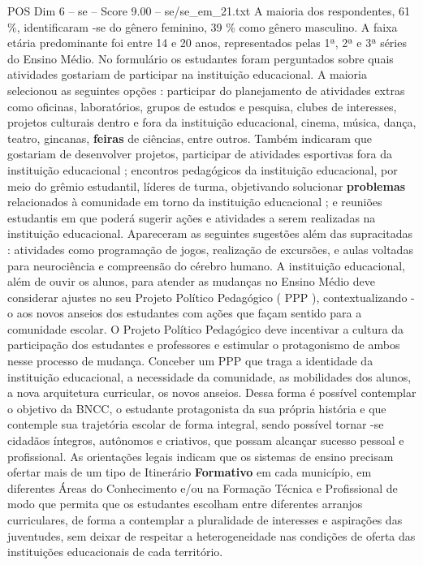 \begin{textsample}{POS Dim 6 – se – Score 9.00 – se/se\_em\_21.txt}
A maioria dos respondentes, 61 \%, identificaram -se do gênero feminino, 39 \% como gênero masculino.
A faixa etária predominante foi entre 14 e 20 anos, representados pelas 1ª, 2ª e 3ª séries do Ensino Médio.
No formulário os estudantes foram perguntados sobre quais atividades gostariam de participar na instituição educacional.
A maioria selecionou as seguintes opções : participar do planejamento de atividades extras como oficinas, laboratórios, grupos de estudos e pesquisa, clubes de interesses, projetos culturais dentro e fora da instituição educacional, cinema, música, dança, teatro, gincanas, \textbf{feiras} de ciências, entre outros.
Também indicaram que gostariam de desenvolver projetos, participar de atividades esportivas fora da instituição educacional ; encontros pedagógicos da instituição educacional, por meio do grêmio estudantil, líderes de turma, objetivando solucionar \textbf{problemas} relacionados à comunidade em torno da instituição educacional ; e reuniões estudantis em que poderá sugerir ações e atividades a serem realizadas na instituição educacional.
Apareceram as seguintes sugestões além das supracitadas : atividades como programação de jogos, realização de excursões, e aulas voltadas para neurociência e compreensão do cérebro humano.
A instituição educacional, além de ouvir os alunos, para atender as mudanças no Ensino Médio deve considerar ajustes no seu Projeto Político Pedagógico ( PPP ), contextualizando -o aos novos anseios dos estudantes com ações que façam sentido para a comunidade escolar.
O Projeto Político Pedagógico deve incentivar a cultura da participação dos estudantes e professores e estimular o protagonismo de ambos nesse processo de mudança.
Conceber um PPP que traga a identidade da instituição educacional, a necessidade da comunidade, as mobilidades dos alunos, a nova arquitetura curricular, os novos anseios.
Dessa forma é possível contemplar o objetivo da BNCC, o estudante protagonista da sua própria história e que contemple sua trajetória escolar de forma integral, sendo possível tornar -se cidadãos íntegros, autônomos e criativos, que possam alcançar sucesso pessoal e profissional.
As orientações legais indicam que os sistemas de ensino precisam ofertar mais de um tipo de Itinerário \textbf{Formativo} em cada município, em diferentes Áreas do Conhecimento e/ou na Formação Técnica e Profissional de modo que permita que os estudantes escolham entre diferentes arranjos curriculares, de forma a contemplar a pluralidade de interesses e aspirações das juventudes, sem deixar de respeitar a heterogeneidade nas condições de oferta das instituições educacionais de cada território.

\end{textsample}
